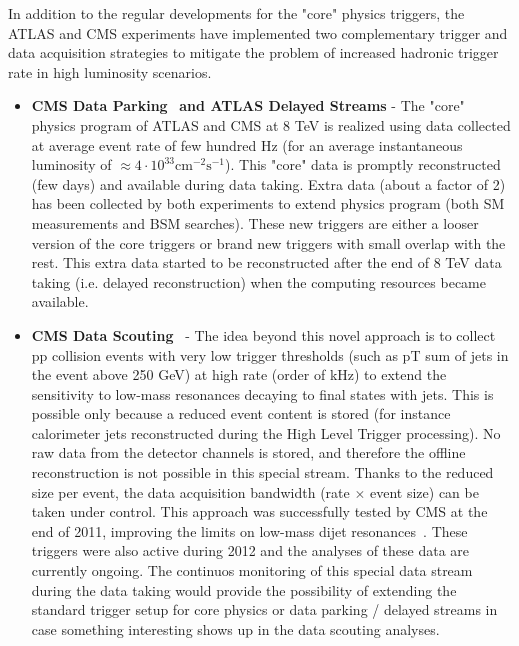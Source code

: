 \documentclass{PoS}
\begin{document}
In addition to the regular developments for the "core" physics triggers, the ATLAS and CMS experiments have implemented two complementary trigger and data acquisition strategies to mitigate the problem of increased hadronic trigger rate in high luminosity scenarios.
\begin{itemize}
\item {\bf CMS Data Parking}~\cite{CMS-DP-2012-022} {\bf and ATLAS Delayed Streams} - The "core" physics program of ATLAS and CMS  at 8 TeV is realized using data collected at average event rate of few hundred Hz (for an average instantaneous luminosity of  $\approx 4 \cdot 10^{33} \mbox{cm}^{-2}\mbox{s}^{-1}$). This "core" data is promptly reconstructed (few days) and available during data taking.  Extra data (about a factor of 2) has been collected by both experiments to extend physics program (both SM measurements and BSM searches). 
These new triggers are either a looser version of the core triggers or brand new triggers with small overlap with the rest. This extra data started to be reconstructed after the end of 8 TeV data taking (i.e. delayed reconstruction) when the computing resources became available.
\item {\bf CMS Data Scouting}~\cite{CMS-DP-2012-022} - The idea beyond this novel approach is to collect pp collision events with very low trigger thresholds (such as pT sum of jets in the event above 250 GeV) at high rate (order of kHz) to extend the sensitivity to low-mass resonances decaying to final states with jets. This is possible only because a reduced event content is stored (for instance calorimeter jets reconstructed during the High Level Trigger processing). No raw data from the detector channels is stored, and therefore the offline reconstruction is not possible in this special stream. Thanks to the reduced size per event, the data acquisition bandwidth (rate $\times$ event size) can be taken
under control. This approach was successfully tested by CMS at the end of 2011, improving the limits on low-mass dijet resonances~\cite{CMS-PAS-EXO-11-094}. These triggers were also active during 2012 and the analyses of these data are currently ongoing. The continuos monitoring of this special data stream during the data taking would provide the possibility of extending the standard trigger setup for core physics or data parking / delayed streams in case something interesting shows up in the data scouting analyses. 
\end{itemize}

\end{document}
